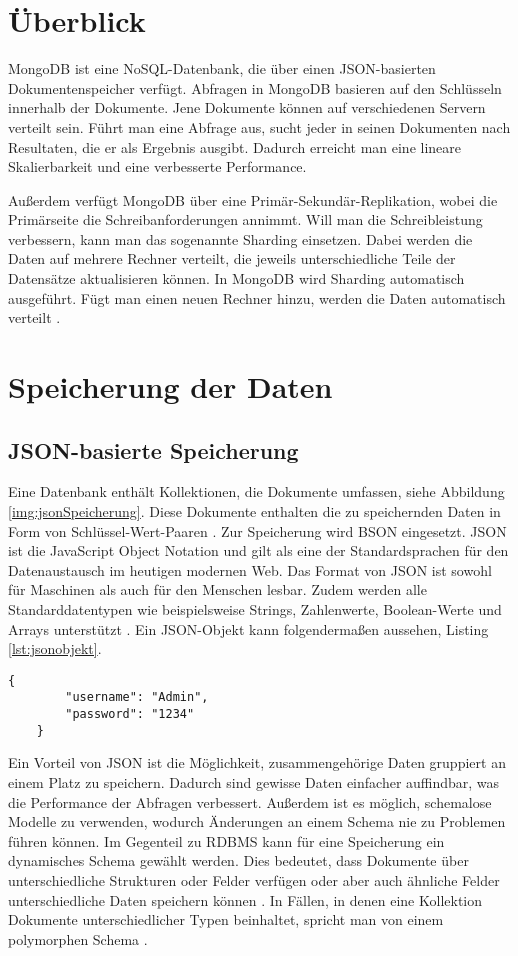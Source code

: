 \section{Überblick}
MongoDB ist eine NoSQL-Datenbank, die über einen JSON-basierten Dokumentenspeicher verfügt. Abfragen in MongoDB basieren auf den Schlüsseln innerhalb der Dokumente. Jene Dokumente können auf verschiedenen Servern verteilt sein. Führt man eine Abfrage aus, sucht jeder in seinen Dokumenten nach Resultaten, die er als Ergebnis ausgibt. Dadurch erreicht man eine lineare Skalierbarkeit und eine verbesserte Performance. 

Außerdem verfügt MongoDB über eine Primär-Sekundär-Replikation, wobei die Primärseite die Schreibanforderungen annimmt. Will man die Schreibleistung verbessern, kann man das sogenannte Sharding einsetzen. Dabei werden die Daten auf mehrere Rechner verteilt, die jeweils unterschiedliche Teile der Datensätze aktualisieren können. In MongoDB wird Sharding automatisch ausgeführt. Fügt man einen neuen Rechner hinzu, werden die Daten automatisch verteilt \cite[S.26]{zwei}.

\section{Speicherung der Daten}
\subsection{JSON-basierte Speicherung}
Eine Datenbank enthält Kollektionen, die Dokumente umfassen, siehe Abbildung \ref*{img:jsonSpeicherung}. Diese Dokumente enthalten die zu speichernden Daten \cite[S.30]{zwei} in Form von Schlüssel-Wert-Paaren \cite[S.27]{zwei}. Zur Speicherung wird \ac{BSON} eingesetzt. JSON ist die JavaScript Object Notation und gilt als eine der Standardsprachen für den Datenaustausch im heutigen modernen Web. Das Format von JSON ist sowohl für Maschinen als auch für den Menschen lesbar. Zudem werden alle Standarddatentypen wie beispielsweise Strings, Zahlenwerte, Boolean-Werte und Arrays unterstützt \cite[S.31]{zwei}. Ein JSON-Objekt kann folgendermaßen aussehen, Listing \ref{lst:jsonobjekt}.

\begin{lstlisting}[caption=JSON-Objekt, label=lst:jsonobjekt,float=!htb]
    {
        "username": "Admin",
        "password": "1234"
    }
\end{lstlisting}

Ein Vorteil von JSON ist die Möglichkeit, zusammengehörige Daten gruppiert an einem Platz zu speichern. Dadurch sind gewisse Daten einfacher auffindbar, was die Performance der Abfragen verbessert. Außerdem ist es möglich, schemalose Modelle zu verwenden, wodurch Änderungen an einem Schema nie zu Problemen führen können.
Im Gegenteil zu RDBMS kann für eine Speicherung ein dynamisches Schema gewählt werden. Dies bedeutet, dass Dokumente über unterschiedliche Strukturen oder Felder verfügen oder aber auch ähnliche Felder unterschiedliche Daten speichern können \cite[S.26f.]{zwei}. In Fällen, in denen eine Kollektion Dokumente unterschiedlicher Typen beinhaltet, spricht man von einem polymorphen Schema \cite[S.32]{zwei}.

